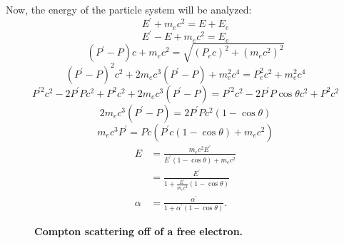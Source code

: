 Now, the energy of the particle system will be analyzed:
\begin{equation*}
  E^{'} + m_ec^2 = E + E_e
\end{equation*}
\begin{equation*}
  E^{'}-E + m_ec^2 = E_e
\end{equation*}
\begin{equation*}
  (P^{'} - P)c + m_ec^2 = \sqrt{\left(P_ec\right)^2 + \left(m_ec^2\right)^2}
\end{equation*}
\begin{equation*}
  (P^{'} - P)^2c^2 + 2m_ec^3(P^{'} - P) + m_e^2c^4 = P_e^2c^2 + m_e^2c^4
\end{equation*}
\begin{equation*}
  P^{'2}c^2 - 2P^{'}Pc^2 + P^2c^2 + 2m_ec^3(P^{'} - P) = P^{'2}c^2 - 
  2P^{'}P\cos{\theta}c^2 + P^2c^2
\end{equation*}
\begin{equation*}
  2m_ec^3(P^{'} - P) = 2P^{'}Pc^2(1 - \cos{\theta})
\end{equation*}
\begin{equation*}
  m_ec^3P^{'} = Pc(P^{'}c(1 - \cos{\theta}) + m_ec^2)
\end{equation*}
\begin{align}
  E & = \frac{m_ec^2E^{'}}{E^{'}(1 - \cos{\theta}) + m_ec^2} \nonumber \\
  & = \frac{E^{'}}{1 + \frac{E^{'}}{m_ec^2}(1 - \cos{\theta})} \\
  \alpha & = \frac{\alpha^{'}}{1 + \alpha^{'}(1 - \cos{\theta})}.
\end{align}

\begin{figure}[t!]
  \begin{center}
  \end{center}
  \caption{\textbf{Compton scattering off of a free electron.}}
  \label{fig:compton_scatter_free_electron}
\end{figure}

